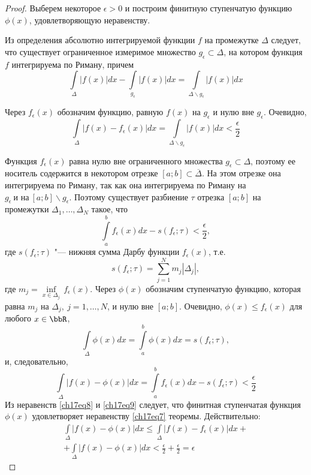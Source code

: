 \begin{proof}
Выберем некоторое $\epsilon > 0$ и построим финитную ступенчатую функцию $\phi(x)$, удовлетворяющую неравенству.

Из определения абсолютно интегрируемой функции $f$ на промежутке $\Delta$ следует, что существует ограниченное измеримое множество $g_{\epsilon} \subset \Delta$, на котором функция $f$ интегрируема по Риману, причем
$$
\int\limits_{\Delta} |f(x)|dx - \int\limits_{g_{\epsilon}} |f(x)|dx = \int\limits_{\Delta\backslash g_{\epsilon}} |f(x)|dx
$$

Через $f_{\epsilon}(x)$ обозначим функцию, равную $f(x)$ на $g_{\epsilon}$ и нулю вне $g_{\epsilon}$. Очевидно,
\begin{equation} \label{ch17eq8}
\int\limits_{\Delta} |f(x) - f_{\epsilon}(x)|dx = \int\limits_{\Delta\backslash g_{\epsilon}} |f(x)|dx < \frac{\epsilon}{2}
\end{equation}

Функция $f_{\epsilon}(x)$ равна нулю вне ограниченного множества $g_{\epsilon} \subset \Delta$, поэтому ее носитель содержится в некотором отрезке $[a;b] \subset \overline{\Delta}$. На этом отрезке она интегрируема по Риману, так как она интегрируема по Риману на $g_{\epsilon}\ \text{и на}\ [a;b]\backslash g_{\epsilon}$. Поэтому существует разбиение $\tau$ отрезка $[a;b]$ на промежутки $\Delta_1,\ldots,\Delta_N$ такое, что
$$
\int\limits_{a}^{b} f_{\epsilon}(x)dx - s(f_{\epsilon};\tau) < \frac{\epsilon}{2},
$$
где $s(f_{\epsilon};\tau)$ "--- нижняя сумма Дарбу функции $f_{\epsilon}(x)$, т.е.
$$
s(f_{\epsilon};\tau) = \sum_{j = 1}^{N} m_{j}|\Delta_j|,
$$
где $m_j = \inf\limits_{x \in \Delta_j}\,f_{\epsilon}(x)$. Через $\phi(x)$ обозначим ступенчатую функцию, которая равна $m_j$ на $\Delta_j,\ j = 1,\ldots,N$, и нулю вне $[a;b]$. Очевидно, $\phi(x) \le f_{\epsilon}(x)$ для любого $x \in \bbR$,
$$
\int\limits_{\Delta} \phi(x)dx = \int\limits_{a}^{b} \phi(x)dx = s(f_{\epsilon};\tau),
$$
и, следовательно,
\begin{equation} \label{ch17eq9}
\int\limits_{\Delta} |f(x) - \phi(x)|dx = \int\limits_{a}^{b} f_{\epsilon}(x)dx - s(f_{\epsilon};\tau) < \frac{\epsilon}{2}
\end{equation}
Из неравенств \eqref{ch17eq8} и \eqref{ch17eq9} следует, что финитная ступенчатая функция $\phi(x)$ удовлетворяет неравенству \eqref{ch17eq7} теоремы. Действительно:
\begin{multline*}
\int\limits_{\Delta} |f(x) - \phi(x)|dx \le \int\limits_{\Delta} |f(x) - f_{\epsilon}(x)|dx+\\
+\int\limits_{\Delta} |f(x) - \phi(x)|dx < \frac{\epsilon}{2} + \frac{\epsilon}{2} = \epsilon
\end{multline*}
\end{proof}

